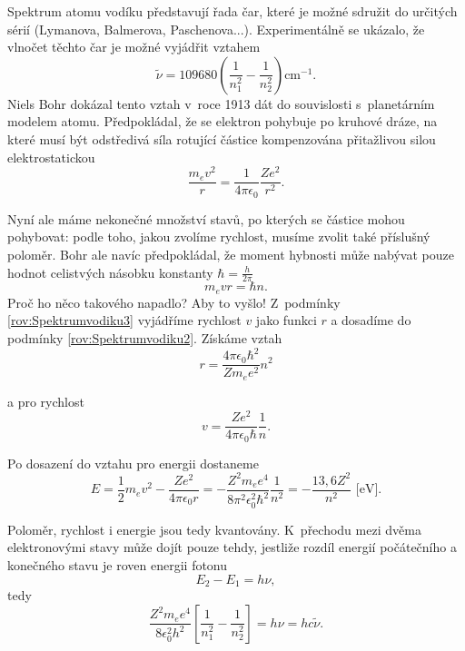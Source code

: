 Spektrum atomu vodíku představují řada čar, které je možné sdružit do určitých sérií (Lymanova, Balmerova, Paschenova...). Experimentálně se ukázalo, že vlnočet těchto čar je možné vyjádřit vztahem
\begin{equation}
\tilde{\nu} = 109680\left( \frac{1}{n_1^2} - \frac{1}{n_2^2}\right ) \mathrm{cm} ^{-1}\mbox{.}
\label{rov:Spektrumvodiku1}
\end{equation}
Niels Bohr dokázal tento vztah v~roce 1913 dát do souvislosti s~planetárním modelem atomu. Předpokládal, že se elektron pohybuje po kruhové dráze, na které musí být odstředivá síla rotující částice kompenzována přitažlivou silou elektrostatickou
\begin{equation}
\frac{m_{e}v^2}{r} = \frac{1}{4\pi \epsilon_0}\frac{Ze^2}{r^2}\mbox{.}
\label{rov:Spektrumvodiku2}
\end{equation}

\noindent Nyní ale máme nekonečné množství stavů, po kterých se částice mohou pohybovat: podle toho, jakou zvolíme rychlost, musíme zvolit také příslušný poloměr. Bohr ale navíc předpokládal, že moment hybnosti může nabývat pouze hodnot celistvých násobku konstanty $\hbar=\frac{h}{2\pi}$
\begin{equation}
m_{e}vr = \hbar n \mbox{.}
\label{rov:Spektrumvodiku3}
\end{equation}
\noindent Proč ho něco takového napadlo? Aby to vyšlo! Z~podmínky \ref{rov:Spektrumvodiku3} vyjádříme rychlost $v$ jako funkci $r$ a dosadíme do podmínky \ref{rov:Spektrumvodiku2}. Získáme vztah
\begin{equation}
r = \frac{4\pi\epsilon_0\hbar^2}{Zm_e e^2}n^2
\label{rov:Spektrumvodiku4}
\end{equation}

\noindent a pro rychlost
\begin{equation}
v = \frac{Ze^2}{4\pi\epsilon_0\hbar}\frac{1}{n}\mbox{.}
\label{rov:Spektrumvodiku5}
\end{equation}

\noindent Po dosazení do vztahu pro energii dostaneme
\begin{equation}
\boxed{E = \frac{1}{2}m_e v^2 - \frac{Ze^2}{4\pi\epsilon_0r} = - \frac{Z^2m_e e^4}{8 \pi^2 \epsilon_0^2\hbar^2}\frac{1}{n^2} = -\frac{13,6 Z^2}{n^2} \mbox{ [eV]}\mbox{.}}
\label{Spektrumvodiku6}
\end{equation}

\noindent Poloměr, rychlost i energie jsou tedy kvantovány. K~přechodu mezi dvěma elektronovými stavy může dojít pouze tehdy, jestliže rozdíl energií počátečního a konečného stavu je roven energii fotonu
\begin{equation}
E_2-E_1 = h\nu,
\label{rov:Spektrumvodiku7}
\end{equation}
tedy
\begin{equation}
\frac{Z^2m_e e^4}{8\epsilon_0^2h^2}\left[ \frac{1}{n_1^2} - \frac{1}{n_2^2} \right ] = h\nu = hc\tilde{\nu}.
\label{rov:Spektrumvodiku8}
\end{equation}

